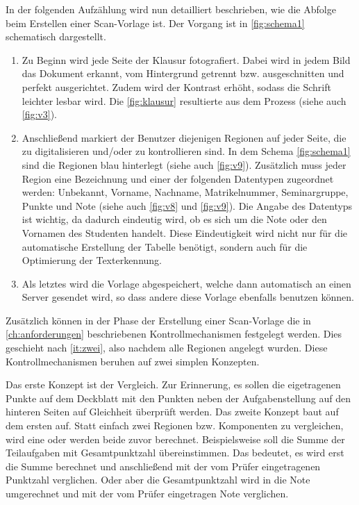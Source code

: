 \documentclass[notables, nomenclature, oneside, 150]{HSMW-Thesis}
\begin{document}
		In der folgenden Aufzählung wird nun detailliert beschrieben, wie die Abfolge beim Erstellen einer Scan-Vorlage ist. Der Vorgang ist in  \autoref{fig:schema1} schematisch dargestellt.
	
		\begin{enumerate}
			\item Zu Beginn wird jede Seite der Klausur fotografiert. Dabei wird in jedem Bild das Dokument erkannt, vom Hintergrund getrennt bzw. ausgeschnitten und perfekt ausgerichtet. Zudem wird der Kontrast erhöht, sodass die Schrift leichter lesbar wird. Die \autoref{fig:klausur} resultierte aus dem Prozess (siehe auch \autoref{fig:v3}). 
		
			\item Anschließend markiert der Benutzer diejenigen Regionen auf jeder Seite, die zu digitalisieren und/oder zu kontrollieren sind. In dem Schema \ref{fig:schema1} sind die Regionen blau hinterlegt (siehe auch \autoref{fig:v9}). Zusätzlich muss jeder Region eine Bezeichnung und einer der folgenden Datentypen zugeordnet werden: Unbekannt, Vorname, Nachname, Matrikelnummer, Seminargruppe, Punkte und Note (siehe auch \autoref{fig:v8} und \ref{fig:v9}). Die Angabe des Datentyps ist wichtig, da dadurch eindeutig wird, ob es sich um die Note oder den Vornamen des Studenten handelt. Diese Eindeutigkeit wird nicht nur für die automatische Erstellung der Tabelle benötigt, sondern auch für die Optimierung der Texterkennung. \label{it:zwei}
			
			\item Als letztes wird die Vorlage abgespeichert, welche dann automatisch an einen Server gesendet wird, so dass andere diese Vorlage ebenfalls benutzen können.
		\end{enumerate}
 		Zusätzlich können in der Phase der Erstellung einer Scan-Vorlage die in \autoref{ch:anforderungen} beschriebenen Kontrollmechanismen festgelegt werden. Dies geschieht nach \autoref{it:zwei}, also nachdem alle Regionen angelegt wurden. Diese Kontrollmechanismen beruhen auf zwei simplen Konzepten. 

 		Das erste Konzept ist der Vergleich. Zur Erinnerung, es sollen die eigetragenen Punkte auf dem Deckblatt mit den Punkten neben der Aufgabenstellung auf den hinteren Seiten auf Gleichheit überprüft werden. Das zweite Konzept baut auf dem ersten auf. Statt einfach zwei Regionen bzw. Komponenten zu vergleichen, wird eine oder werden beide zuvor berechnet. Beispielsweise soll die Summe der Teilaufgaben mit Gesamtpunktzahl übereinstimmen. Das bedeutet, es wird erst die Summe berechnet und anschließend mit der vom Prüfer eingetragenen Punktzahl verglichen. Oder aber die Gesamtpunktzahl wird in die Note umgerechnet und mit der vom Prüfer eingetragen Note verglichen. 
 	
\end{document}
